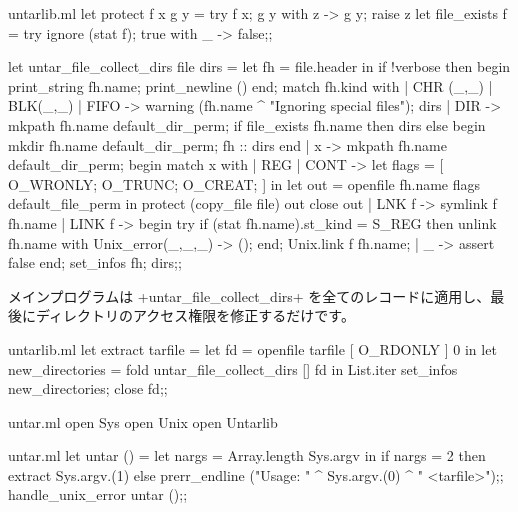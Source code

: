 \begin{answer}
\begin{listingcodefile}{untarlib.ml}
let protect f x g y = try f x; g y with z -> g y; raise z
let file_exists f = try ignore (stat f); true with _ -> false;;

let untar_file_collect_dirs file dirs =
  let fh = file.header in
  if !verbose then begin print_string fh.name; print_newline () end;
  match fh.kind with
  | CHR (_,_) | BLK(_,_) | FIFO ->
      warning (fh.name ^ "Ignoring special files");
      dirs
  | DIR ->
      mkpath fh.name default_dir_perm;
      if file_exists fh.name then dirs
      else begin mkdir fh.name default_dir_perm; fh :: dirs end
  | x ->
      mkpath fh.name default_dir_perm;
      begin match x with
      | REG | CONT ->
          let flags = [ O_WRONLY; O_TRUNC; O_CREAT; ] in
          let out = openfile fh.name flags default_file_perm in
          protect (copy_file file) out close out
      | LNK f ->
          symlink f fh.name
      | LINK f ->
          begin
            try if (stat fh.name).st_kind = S_REG then unlink fh.name
            with Unix_error(_,_,_) -> ();
          end;
          Unix.link f fh.name;
      | _ -> assert false
      end;
      set_infos fh;
      dirs;;
\end{listingcodefile}
メインプログラムは \ml+untar_file_collect_dirs+ を全てのレコードに適用し、最後にディレクトリのアクセス権限を修正するだけです。
%
\begin{listingcodefile}{untarlib.ml}
let extract tarfile =
  let fd = openfile tarfile [ O_RDONLY ] 0 in
  let new_directories =
    fold untar_file_collect_dirs [] fd in
  List.iter set_infos new_directories;
  close fd;;
\end{listingcodefile}
%
\begin{codefile}{untar.ml}
open Sys
open Unix
open Untarlib
\end{codefile}
%
\begin{listingcodefile}{untar.ml}
let untar () =
  let nargs = Array.length Sys.argv in
  if nargs = 2 then extract Sys.argv.(1)
  else prerr_endline ("Usage: " ^ Sys.argv.(0) ^ " <tarfile>");;
handle_unix_error untar ();;
\end{listingcodefile}
\end{answer}

